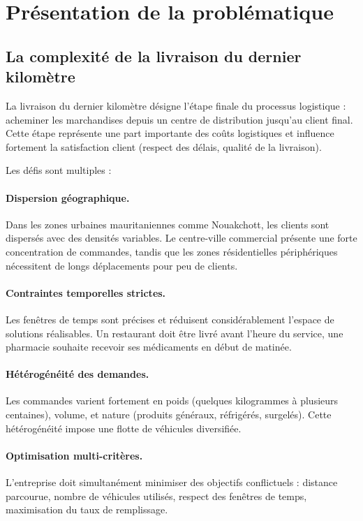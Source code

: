 \documentclass[12pt,a4paper]{report}
\begin{document}
\section{Présentation de la problématique}

\subsection{La complexité de la livraison du dernier kilomètre}

La livraison du dernier kilomètre désigne l'étape finale du processus logistique : acheminer les marchandises depuis un centre de distribution jusqu'au client final. Cette étape représente une part importante des coûts logistiques et influence fortement la satisfaction client (respect des délais, qualité de la livraison).

Les défis sont multiples :

\paragraph{Dispersion géographique.} Dans les zones urbaines mauritaniennes comme Nouakchott, les clients sont dispersés avec des densités variables. Le centre-ville commercial présente une forte concentration de commandes, tandis que les zones résidentielles périphériques nécessitent de longs déplacements pour peu de clients.

\paragraph{Contraintes temporelles strictes.} Les fenêtres de temps sont précises et réduisent considérablement l'espace de solutions réalisables. Un restaurant doit être livré avant l'heure du service, une pharmacie souhaite recevoir ses médicaments en début de matinée.

\paragraph{Hétérogénéité des demandes.} Les commandes varient fortement en poids (quelques kilogrammes à plusieurs centaines), volume, et nature (produits généraux, réfrigérés, surgelés). Cette hétérogénéité impose une flotte de véhicules diversifiée.

\paragraph{Optimisation multi-critères.} L'entreprise doit simultanément minimiser des objectifs conflictuels : distance parcourue, nombre de véhicules utilisés, respect des fenêtres de temps, maximisation du taux de remplissage.
\end{document}
